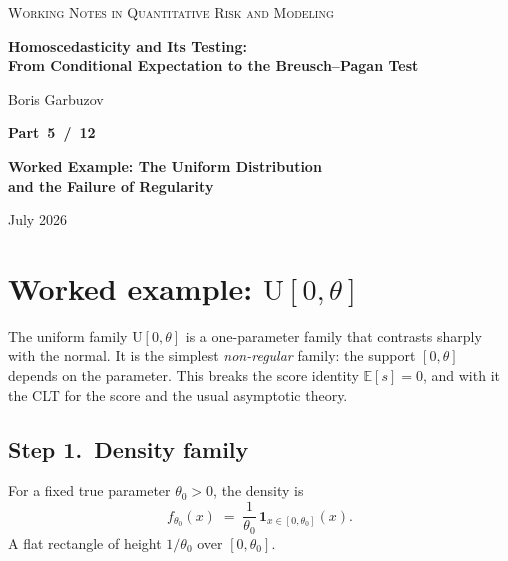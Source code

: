 \documentclass[a4paper,oneside,12pt]{extarticle}
\theoremstyle{plain}
\theoremstyle{definition}
\theoremstyle{remark}
\newcommand*{\E}{\mathbb{E}}
\begin{document}
\begin{titlepage}
\begin{center}

{\footnotesize\scshape\color{gray}
Working Notes in Quantitative Risk and Modeling
}

\vfill

{\LARGE\bfseries Homoscedasticity and Its Testing:\\[4pt]
From Conditional Expectation to the Breusch--Pagan Test}

\vspace{36pt}

{\normalsize Boris Garbuzov}

\vfill

{\Large\bfseries Part~5~/~12}

\vspace{6pt}

{\Large\bfseries Worked Example: The Uniform Distribution\\and the Failure of Regularity}

\vfill

{\small July 2026}

\end{center}
\end{titlepage}

\setcounter{tocdepth}{2}
\tableofcontents
\newpage
\section{Worked example: $\mathrm{U}[0,\theta]$}
\label{sec:uniform_example}

The uniform family $\mathrm{U}[0,\theta]$ is a one-parameter family
that contrasts sharply with the normal.  It is the simplest
\emph{non-regular} family: the support $[0,\theta]$ depends on the
parameter.  This breaks the score identity $\E[s]=0$, and with it
the CLT for the score and the usual asymptotic theory.

\subsection{Step 1.\ Density family}

For a fixed true parameter $\theta_0 > 0$, the density is
\[
  f_{\theta_0}(x)
  \;=\; \frac{1}{\theta_0}\,\mathbf{1}_{x\in[0,\theta_0]}(x).
\]
A flat rectangle of height $1/\theta_0$ over $[0,\theta_0]$.
\end{document}
